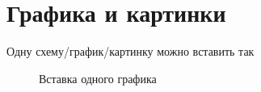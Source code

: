     \newpage
    \section{Графика и картинки}

    Одну схему/график/картинку можно вставить так
    \begin{figure}[ht!]
    \caption{\label{fig:Model_of_Edge} Вставка одного графика }
    \end{figure}

